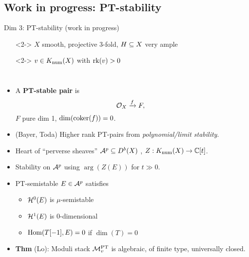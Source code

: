 \documentclass[8pt,handout]{beamer} %
\begin{document}
\subsection{Work in progress: PT-stability}
\begin{frame}{Dim 3: PT-stability (work in progress)}
    \begin{itemize}
        \item[]<2-> $X$ smooth, projective 3-fold, $H \subseteq X$ very ample
        \item[]<2-> $v \in K_{\mathrm{num}}(X)$ with $\operatorname{\mathrm{rk}}(v) > 0$
    \end{itemize}
    
    \begin{columns}[t]
        \begin{itemize}
            \item<3-> A \textbf{PT-stable pair} is
            \[ \mathcal{O}_X \xrightarrow{f} F, \]
            $F$ pure dim 1, $\dim(\operatorname{\mathrm{coker}}(f)) = 0$.
            \item<4-> (Bayer, Toda) Higher rank PT-pairs from \textit{polynomial/limit stability}.
            \item<5-> Heart of ``perverse sheaves'' $\mathcal{A}^p \subseteq D^b(X)$ , $Z: K_{\mathrm{num}}(X) \to \mathbb{C}[t]$.
            \item<5-> Stability on $\mathcal{A}^p$ using $\arg(Z(E))$ for $t \gg 0$.
            \item<6-> PT-semistable $E \in \mathcal{A}^p$ satisfies
            \begin{itemize}
                \item<7-> $\mathcal{H}^0(E)$ is $\mu$-semistable
                \item<7-> $\mathcal{H}^1(E)$ is 0-dimensional
                \item<8-> $\mathrm{Hom}(T[-1], E) = 0$ if $\dim(T) = 0$
            \end{itemize}
            \item<9-> \textbf{Thm} (Lo): Moduli stack $\mathcal{M}^{\text{PT}}_v$ is algebraic, of finite type, universally closed.
        \end{itemize}
        

\end{columns}
\end{frame}
\end{document}
